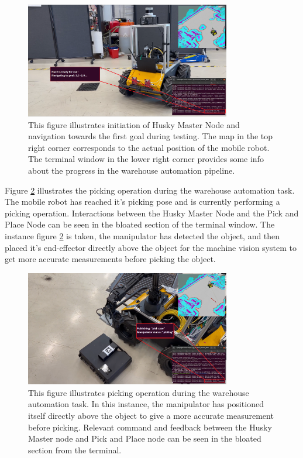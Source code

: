 \begin{figure}[H]
  \centering
  \includegraphics[width = 0.8\textwidth]{Figures/figHuskyFinalExperiment1.png}
  \caption{This figure illustrates initiation of Husky Master Node and navigation towards the first goal during testing. The map in the top right corner corresponds to the actual position of the mobile robot. The terminal window in the lower right corner provides some info about the progress in the warehouse automation pipeline.}
  \label{fig:R:WA:finalExperiment1}
\end{figure}

Figure \ref{fig:R:WA:finalExperiment2} illustrates the picking operation during the warehouse automation task. The mobile robot has reached it's picking pose and is currently performing a picking operation. Interactions between the Husky Master Node and the Pick and Place Node can be seen in the bloated section of the terminal window. The instance figure \ref{fig:R:WA:finalExperiment2} is taken, the manipulator has detected the object, and then placed it's end-effector directly above the object for the machine vision system to get more accurate measurements before picking the object.

\begin{figure}[H]
  \centering
  \includegraphics[width = 0.8\textwidth]{Figures/figHuskyFinalExperiment2.png}
  \caption{This figure illustrates picking operation during the warehouse automation task. In this instance, the manipulator has positioned itself directly above the object to give a more accurate measurement before picking. Relevant command and feedback between the Husky Master node and Pick and Place node can be seen in the bloated section from the terminal.}
  \label{fig:R:WA:finalExperiment2}
\end{figure}

